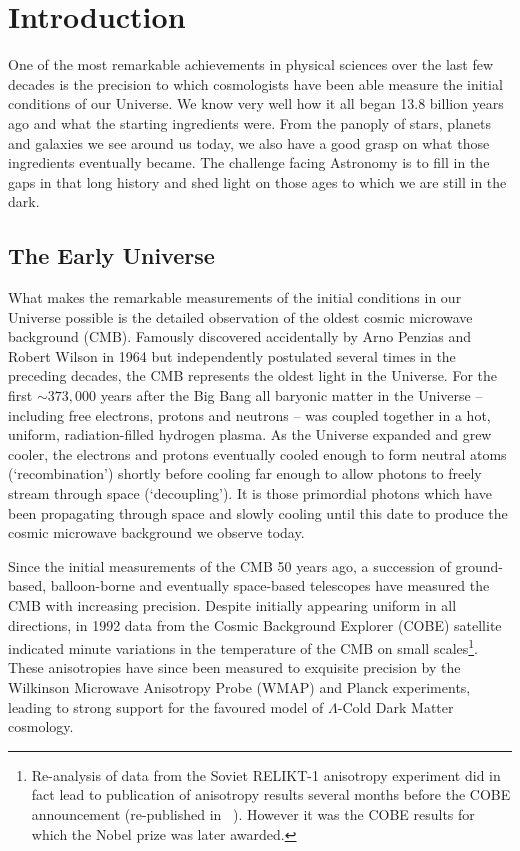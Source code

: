 
\chapter[Introduction]{Introduction} 
\label{ch:introduction}

One of the most remarkable achievements in physical sciences over the last few decades is the precision to which cosmologists have been able measure the initial conditions of our Universe. We know very well how it all began 13.8 billion years ago and what the starting ingredients were. From the panoply of stars, planets and galaxies we see around us today, we also have a good grasp on what those ingredients eventually became. The challenge facing Astronomy is to fill in the gaps in that long history and shed light on those ages to which we are still in the dark.

\section{The Early Universe}
What makes the remarkable measurements of the initial conditions in our Universe possible is the detailed observation of the oldest cosmic microwave background (CMB). Famously discovered accidentally by Arno Penzias and Robert Wilson in 1964 \citep{Penzias:1965es} but independently postulated several times in the preceding decades, the CMB represents the oldest light in the Universe. For the first $\sim 373,000$ years after the Big Bang all baryonic matter in the Universe -- including free electrons, protons and neutrons -- was coupled together in a hot, uniform, radiation-filled hydrogen plasma. As the Universe expanded and grew cooler, the electrons and protons eventually cooled enough to form neutral atoms (`recombination') shortly before cooling far enough to allow photons to freely stream through space (`decoupling'). It is those primordial photons which have been propagating through space and slowly cooling until this date to produce the cosmic microwave background we observe today.

Since the initial measurements of the CMB 50 years ago, a succession of ground-based, balloon-borne and eventually space-based telescopes have measured the CMB with increasing precision. Despite initially appearing uniform in all directions, in 1992 data from the Cosmic Background Explorer (COBE) satellite indicated minute variations in the temperature of the CMB on small scales\footnote{Re-analysis of data from the Soviet RELIKT-1 anisotropy experiment did in fact lead to publication of anisotropy results several months before the COBE announcement (re-published in \citeauthor{Strukov:1992ua}~\citeyear{Strukov:1992ua}). However it was the COBE results for which the Nobel prize was later awarded.}. These anisotropies have since been measured to exquisite precision by the Wilkinson Microwave Anisotropy Probe (WMAP) and Planck experiments, leading to strong support for the favoured model of $\Lambda$-Cold Dark Matter cosmology. 


